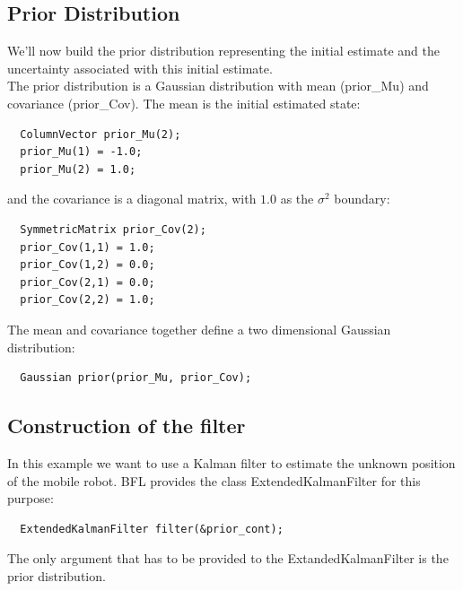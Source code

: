 \documentclass[a4paper,10pt]{report}
\begin{document}
\subsection{Prior Distribution}
We'll now build the prior distribution representing the initial
estimate and the uncertainty associated with this initial estimate.\\
The prior distribution is a Gaussian distribution with mean
(prior\_Mu) and covariance (prior\_Cov).  The mean is the initial
estimated state:
\begin{verbatim}
  ColumnVector prior_Mu(2);
  prior_Mu(1) = -1.0;
  prior_Mu(2) = 1.0;
\end{verbatim}
and the covariance is a diagonal matrix, with $1.0$ as the $\sigma^2$
boundary:
\begin{verbatim}
  SymmetricMatrix prior_Cov(2);
  prior_Cov(1,1) = 1.0;
  prior_Cov(1,2) = 0.0;
  prior_Cov(2,1) = 0.0;
  prior_Cov(2,2) = 1.0;
\end{verbatim}
The mean and covariance together define a two dimensional Gaussian
distribution:
\begin{verbatim}
  Gaussian prior(prior_Mu, prior_Cov);
\end{verbatim}




\subsection{Construction of the filter}
In this example we want to use a Kalman filter to estimate the unknown
position of the mobile robot. BFL provides the class
ExtendedKalmanFilter for this purpose:
\begin{verbatim}
  ExtendedKalmanFilter filter(&prior_cont);
\end{verbatim}
The only argument that has to be provided to the ExtandedKalmanFilter
is the prior distribution.
\end{document}
